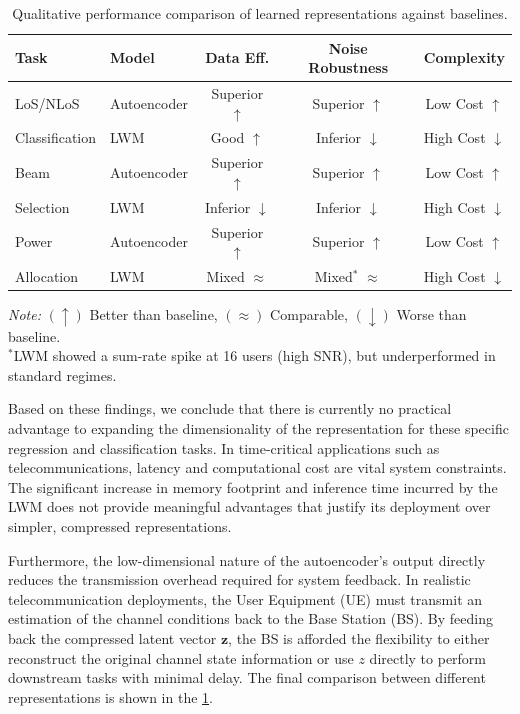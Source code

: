 \begin{table}[htbp]
    \centering
    \caption{Qualitative performance comparison of learned representations against baselines.}
    \label{tab:overall_representation_comparison}
    \renewcommand{\arraystretch}{1.2} 
    \setlength{\tabcolsep}{4pt} 
    \small 
    \begin{tabular}{l l c c c}
        \hline
        \textbf{Task} & \textbf{Model} & \textbf{Data Eff.} & \textbf{Noise Robustness} & \textbf{Complexity} \\
        \hline
        LoS/NLoS & Autoencoder & Superior $\uparrow$ & Superior $\uparrow$ & Low Cost $\uparrow$ \\
        Classification & LWM & Good $\uparrow$ & Inferior $\downarrow$ & High Cost $\downarrow$ \\
        \hline
        Beam & Autoencoder & Superior $\uparrow$ & Superior $\uparrow$ & Low Cost $\uparrow$ \\
        Selection & LWM & Inferior $\downarrow$ & Inferior $\downarrow$ & High Cost $\downarrow$ \\
        \hline
        Power & Autoencoder & Superior $\uparrow$ & Superior $\uparrow$ & Low Cost $\uparrow$ \\
        Allocation & LWM & Mixed $\approx$ & Mixed$^*$ $\approx$ & High Cost $\downarrow$ \\
        \hline
    \end{tabular}
    
    \vspace{1ex}
    {\raggedright \footnotesize \textit{Note:} $(\uparrow)$ Better than baseline, $(\approx)$ Comparable, $(\downarrow)$ Worse than baseline. \\
    $^*$LWM showed a sum-rate spike at 16 users (high SNR), but underperformed in standard regimes.\par}
\end{table}

Based on these findings, we conclude that there is currently no practical advantage to expanding the dimensionality of the representation for these specific regression and classification tasks. In time-critical applications such as telecommunications, latency and computational cost are vital system constraints. The significant increase in memory footprint and inference time incurred by the LWM does not provide meaningful advantages that justify its deployment over simpler, compressed representations.

Furthermore, the low-dimensional nature of the autoencoder's output directly reduces the transmission overhead required for system feedback. In realistic telecommunication deployments, the User Equipment (UE) must transmit an estimation of the channel conditions back to the Base Station (BS). By feeding back the compressed latent vector $\mathbf{z}$, the BS is afforded the flexibility to either reconstruct the original channel state information or use $z$ directly to perform downstream tasks with minimal delay. The final comparison between different representations is shown in the \ref{tab:overall_representation_comparison}.

